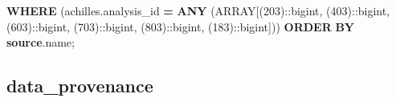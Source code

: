 \documentclass[
]{book}
\newenvironment{Shaded}{\begin{snugshade}}{\end{snugshade}}
\newcommand{\CharTok}[1]{\textcolor[rgb]{0.31,0.60,0.02}{#1}}
\newcommand{\DataTypeTok}[1]{\textcolor[rgb]{0.13,0.29,0.53}{#1}}
\newcommand{\DecValTok}[1]{\textcolor[rgb]{0.00,0.00,0.81}{#1}}
\newcommand{\KeywordTok}[1]{\textcolor[rgb]{0.13,0.29,0.53}{\textbf{#1}}}
\newcommand{\NormalTok}[1]{#1}
\newcommand{\OperatorTok}[1]{\textcolor[rgb]{0.81,0.36,0.00}{\textbf{#1}}}
\begin{document}
\begin{Shaded}
\begin{Highlighting}[]
 \KeywordTok{WHERE}\NormalTok{ (achilles.analysis\_id }\OperatorTok{=} \KeywordTok{ANY}\NormalTok{ (}\DataTypeTok{ARRAY}\NormalTok{[(}\DecValTok{203}\NormalTok{):}\CharTok{:bigint}\NormalTok{, (}\DecValTok{403}\NormalTok{):}\CharTok{:bigint}\NormalTok{, (}\DecValTok{603}\NormalTok{):}\CharTok{:bigint}\NormalTok{, (}\DecValTok{703}\NormalTok{):}\CharTok{:bigint}\NormalTok{, (}\DecValTok{803}\NormalTok{):}\CharTok{:bigint}\NormalTok{, (}\DecValTok{183}\NormalTok{):}\CharTok{:bigint}\NormalTok{]))}
 \KeywordTok{ORDER} \KeywordTok{BY} \KeywordTok{source}\NormalTok{.name;}
\end{Highlighting}
\end{Shaded}

\hypertarget{data_provenance}{%
\subsection*{data\_provenance}\label{data_provenance}}
\end{document}
